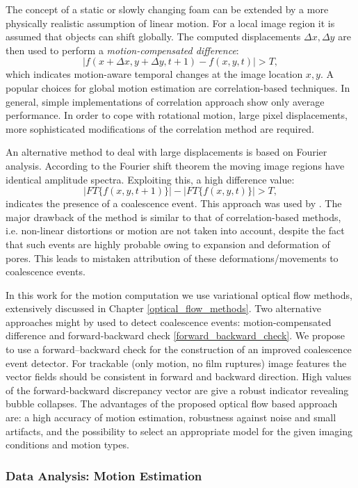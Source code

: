 The concept of a static or slowly changing foam can be extended by a more
physically realistic assumption of linear motion. For a local image region it is assumed that objects can shift globally. The computed displacements $\Delta x, \Delta y$  are then used to perform a \textit{motion-compensated difference}: 
$$ |f(x + \Delta x ,y + \Delta y,t+1) - f(x,y,t)| > T,$$
which indicates motion-aware temporal changes at the image location $x,y$.
A popular choices for global motion estimation are correlation-based techniques. In general, simple implementations of correlation approach show only average performance. In order to cope with rotational motion, large
pixel displacements, more sophisticated modifications of the
correlation method are required. 


An alternative method to deal with large displacements
is based on Fourier analysis. According to the Fourier
shift theorem the moving image regions have identical amplitude spectra. 
Exploiting this, a high difference value:
$$|FT \lbrace f(x,y,t+1) \rbrace | - |FT \lbrace f(x,y,t) \rbrace | > T,$$
indicates the presence of a coalescence event. This
approach was used by \cite{Myagotin09}.
The major drawback of the method is similar to that of correlation-based methods, i.e. non-linear distortions or motion are not taken into account, despite the fact that such events are highly probable
owing to expansion and deformation of pores. This leads to
mistaken attribution of these deformations/movements to coalescence
events.


In this work for the motion computation we use variational optical flow
methods, extensively discussed in Chapter \ref{optical_flow_methods}. Two alternative approaches might by used to detect coalescence events: motion-compensated difference and forward-backward check \ref{forward_backward_check}.
We propose to use a forward–backward check for the construction
of an improved coalescence event detector. For
trackable (only motion, no film ruptures) image features the vector fields should be consistent in forward and backward direction. High values of the forward-backward discrepancy vector are give a robust indicator revealing bubble collapses.
The advantages of the proposed optical flow based
approach are: a high accuracy of motion estimation, robustness against noise and small artifacts, and the possibility to select an appropriate model for the given imaging conditions and motion types.

\subsubsection{Data Analysis: Motion Estimation}


